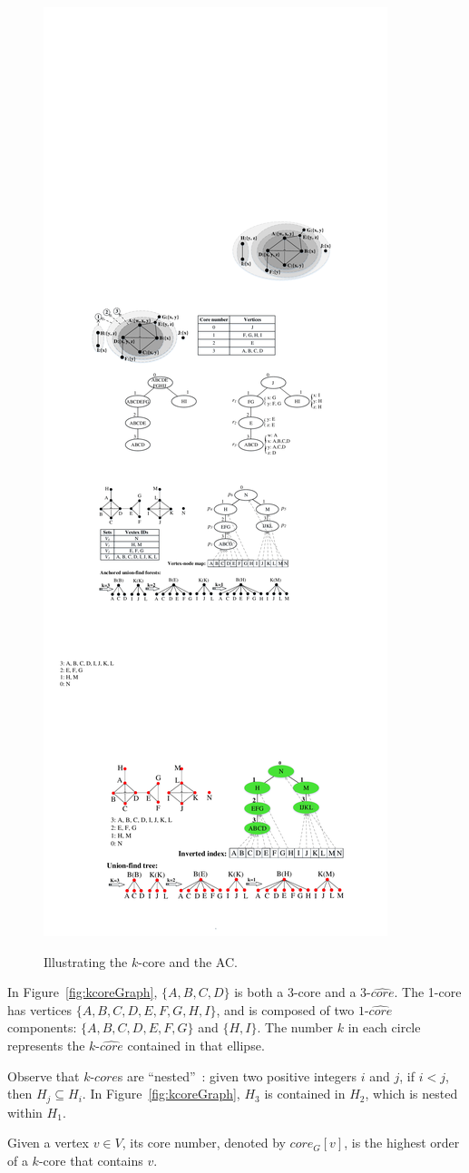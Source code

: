 \begin{figure}[ht]
{{            \includegraphics[width=.40\columnwidth]{figures/kcoreTable}
            \label{fig:kcoreTable}
        }
    }
    \caption{Illustrating the $k$-core and the AC.}
\end{figure}

\begin{example}
\label{eg:problem}
In Figure~\ref{fig:kcoreGraph}, $\{A,B,C,D\}$ is both a 3-core and a 3-$\widehat{core}$. The 1-core has vertices $\{A,B,C,D,E,F,G,H,I\}$, and is composed of two $1$-$\widehat{core}$ components: $\{A,B,C,D,E,F,G\}$ and $\{H,I\}$. The number $k$ in each circle represents the $k$-$\widehat{core}$ contained in that ellipse.
\end{example}

Observe that $k$-$core$s are ``nested''~\cite{kcore2003}: given two positive integers $i$ and $j$, if $i<j$, then $H_j \subseteq H_i$.  In Figure~\ref{fig:kcoreGraph}, $H_3$ is contained in $H_2$, which is nested within $H_1$.

\begin{definition}
\label{def:coreNum}
Given a vertex $v \in V$, its core number, denoted by $core_G[v]$, is the highest order of a $k$-core that contains $v$.
\end{definition}

